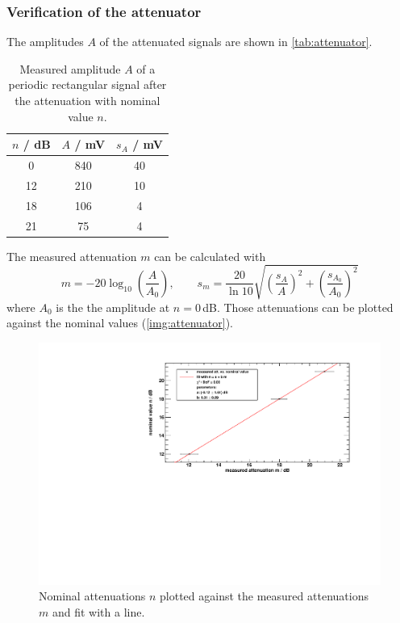 \subsubsection{Verification of the attenuator}
The amplitudes $A$ of the attenuated signals are shown in \autoref{tab:attenuator}.
\begin{table}[H]
\caption{Measured amplitude $A$ of a periodic rectangular signal after the attenuation with nominal value $n$.}
\begin{center}
\begin{tabular}{|c|c|c|}
    \hline
    $n$ / dB 	& $A$ / mV 	& $s_A$ / mV	\\ \hline \hline
    0 			& 840		& 40			\\ \hline
    12			& 210		& 10			\\ \hline
    18			& 106		& 4				\\ \hline
    21			& 75		& 4				\\ \hline
\end{tabular}
\end{center}
\label{tab:attenuator}
\end{table}
The measured attenuation $m$ can be calculated with
\begin{equation}
    m = - 20 \log_{10} \left( \frac{A}{A_0} \right), \qquad s_m = \frac{20}{\ln 10} \sqrt{ \left( \frac{s_A}{A} \right)^2 + \left( \frac{s_{A_0}}{A_0} \right)^2}
\end{equation}
where $A_0$ is the the amplitude at $n=0$\,dB.
Those attenuations can be plotted against the nominal values (\autoref{img:attenuator}).
\begin{figure}[H]
\begin{center}
  \includegraphics[width=\textwidth]{../img/attenuator.pdf}
  \caption{Nominal attenuations $n$ plotted against the measured attenuations $m$ and fit with a line.}
  \label{img:attenuator}
\end{center}
\end{figure}
